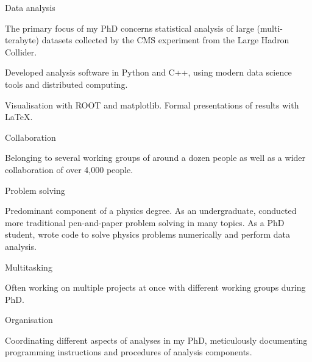 \begin{cventries}

    \cventry
    {} %
    {Data analysis} %
    {} %
    {} %
    {
      \begin{cvitems}
        \item {The primary focus of my PhD concerns statistical analysis of large (multi-terabyte) datasets collected by the CMS experiment from the Large Hadron Collider.}
        \item {Developed analysis software in Python and C++, using modern data science tools and distributed computing.}
        \item{Visualisation with ROOT and matplotlib. Formal presentations of results with LaTeX.}
        \vpadding
        \end{cvitems}
    }

    \cventry
    {} %
    {Collaboration} %
    {} %
    {} %
    {
      \begin{cvitems}
        \item {Belonging to several working groups of around a dozen people as well as a wider collaboration of over 4,000 people.}
        \vpadding
        \end{cvitems}
    }

    \cventry
    {} %
    {Problem solving} %
    {} %
    {} %
    {
      \begin{cvitems}
        \item {Predominant component of a physics degree. As an undergraduate, conducted more traditional pen-and-paper problem solving in many topics. As a PhD student, wrote code to solve physics problems numerically and perform data analysis.}
        \vpadding
        \end{cvitems}
    }

    \cventry
    {} %
    {Multitasking} %
    {} %
    {} %
    {
      \begin{cvitems}
        \item {Often working on multiple projects at once with different working groups during PhD.}
        \vpadding
        \end{cvitems}
    }

    \cventry
    {} %
    {Organisation} %
    {} %
    {} %
    {
      \begin{cvitems}
        \item {Coordinating different aspects of analyses in my PhD, meticulously documenting programming instructions and procedures of analysis components.}
        \vpadding
        \end{cvitems}
        }


\end{cventries}
